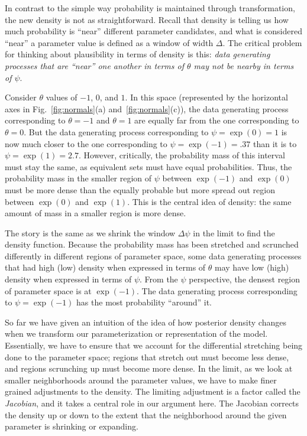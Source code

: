 \documentclass[9pt,twocolumn,twoside]{cidlab-draft}\templatetype{cidlab-invited}
\begin{document}
In contrast to the simple way probability is maintained through transformation, the new density is not as straightforward.  Recall that density is telling us how much probability is ``near'' different parameter candidates, and what is considered ``near'' a parameter value is defined as a window of width $\Delta$.  The critical problem for thinking about plausibility in terms of density is this: \textit{data generating processes that are ``near'' one another in terms of $\theta$ may not be nearby in terms of $\psi$}. 

Consider  $\theta$ values of $-1$, $0$, and $1$. In this space (represented by the horizontal axes in Fig.~\ref{fig:normals}(a) and~\ref{fig:normals}(c)), the data generating process corresponding to $\theta=-1$ and $\theta=1$ are equally far from the one corresponding to $\theta=0$.  But the data generating process corresponding to $\psi=\exp{(0)}=1$ is now much closer to the one corresponding to $\psi=\exp{(-1)} = .37$ than it is to $\psi=\exp{(1)}= 2.7$.  However, critically, the probability mass of this interval must stay the same, as equivalent sets must have equal probabilities. Thus, the probability mass in the smaller region of $\psi$ between $\exp{(-1)}$ and $\exp{(0)}$ must be more dense than the equally probable but more spread out region between $\exp{(0)}$ and $\exp{(1)}$. This is the central idea of density: the same amount of mass in a smaller region is more dense. 

The story is the same as we shrink the window $\Delta\psi$ in the limit to find the density function. Because the probability mass has been stretched and scrunched differently in different regions of parameter space, some data generating processes that had high (low) density when expressed in terms of $\theta$ may have low (high) density when expressed in terms of $\psi$.  From the $\psi$ perspective, the densest region of parameter space is at $\exp{(-1)}$. The data generating process corresponding to $\psi=\exp{(-1)}$ has the most probability ``around'' it. 

So far we have given an intuition of the idea of how posterior density changes when we transform our parameterization or representation of the model. Essentially, we have to ensure that we account for the differential stretching being done to the parameter space; regions that stretch out must become less dense, and regions scrunching up must become more dense.  In the limit, as we look at smaller neighborhoods around the parameter values, we have to make finer grained adjustments to the density. The limiting adjustment is a factor called the \textit{Jacobian}, and it takes a central role in our argument here.  The Jacobian corrects the density up or down to the extent that the neighborhood around the given parameter is shrinking or expanding. 
\end{document}
